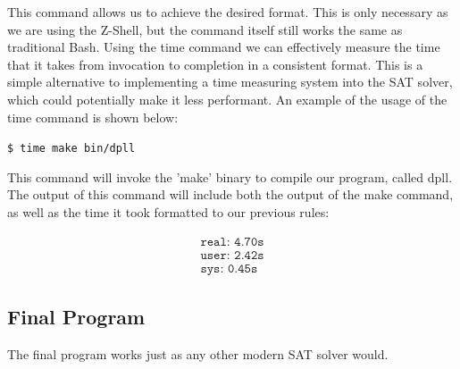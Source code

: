 \documentclass{article}
\begin{document}
This command allows us to achieve the desired format. This is only necessary as we are using the Z-Shell, but the command itself 
still works the same as traditional Bash. Using the time command we can effectively measure the time that it takes from 
invocation to completion in a consistent format. This is a simple alternative to implementing a time measuring system into the 
SAT solver, which could potentially make it less performant. An example of the usage of the time command is shown below:

\begin{center}
    \texttt{\$ time make bin/dpll}
\end{center}

This command will invoke the 'make' binary to compile our program, called dpll. The output of this command will include both the 
output of the make command, as well as the time it took formatted to our previous rules:

\begin{align*}
    \texttt{real: 4.70s} \\
    \texttt{user: 2.42s} \\
    \texttt{sys: 0.45s}
\end{align*}


\subsection{Final Program}
The final program works just as any other modern SAT solver would.
\end{document}
